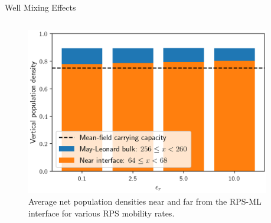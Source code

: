 \documentclass{beamer}
\begin{document}


    \begin{frame}[t]{Well Mixing Effects}
        \begin{columns}
            \begin{column}{0.5\textwidth}
                
                \vspace{20pt}

                \begin{figure}[h]
                    \centering
                    \includegraphics[width=\linewidth]{images/density.png}


                    \caption{Average net population densities near and far from the RPS-ML interface
                    for various RPS mobility rates.}
                \end{figure}
            \end{column}
            \begin{column}{0.5\textwidth}
                

\end{column}
\end{columns}
\end{frame}
\end{document}
